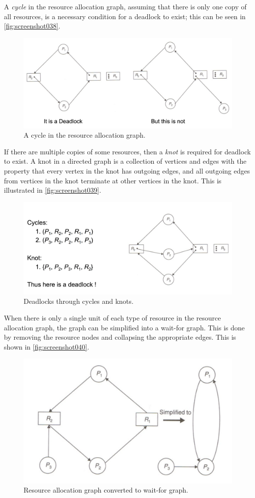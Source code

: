 A \textit{cycle} in the resource allocation graph, assuming that there is only one copy of all resources, is a necessary condition for a deadlock to exist; this can be seen in \autoref{fig:screenshot038}.

\begin{figure}
\centering
\includegraphics[width=0.6\linewidth]{screenshot038}
\caption{A cycle in the resource allocation graph.}
\label{fig:screenshot038}
\end{figure}

If there are multiple copies of some resources, then a \textit{knot} is required for deadlock to exist. A knot in a directed graph is a collection of vertices and edges with the property that every vertex in the knot has outgoing edges, and all outgoing edges from vertices in the knot terminate at other vertices in the knot. This is illustrated in \autoref{fig:screenshot039}.

\begin{figure}
\centering
\includegraphics[width=0.6\linewidth]{screenshot039}
\caption{Deadlocks through cycles and knots.}
\label{fig:screenshot039}
\end{figure}

When there is only a single unit of each type of resource in the resource allocation graph, the graph can be simplified into a wait-for graph. This is done by removing the resource nodes and collapsing the appropriate edges. This is shown in \autoref{fig:screenshot040}.

\begin{figure}
\centering
\includegraphics[width=0.7\linewidth]{screenshot040}
\caption{Resource allocation graph converted to wait-for graph.}
\label{fig:screenshot040}
\end{figure}

